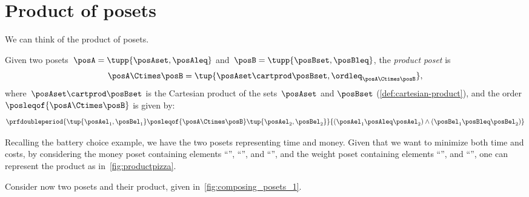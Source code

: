 
\section{Product of posets}
We can think of the product of posets.

\begin{definition}
	\label{def:productposet}
	Given two posets~$\posA=\tupp{\posAset, \posAleq}$ and~$\posB=\tupp{\posBset, \posBleq}$, the \emph{product poset} is
	\begin{equation}
		\posA\Ctimes \posB=\tup{\posAset \cartprod \posBset, \ordleq_{\posA\Ctimes \posB}},
	\end{equation}
	where~$\posAset \cartprod \posBset$ is the Cartesian product of the sets~$\posAset$ and $\posBset$ (\cref{def:cartesian-product}), and the order~$\posleqof{\posA \Ctimes \posB}$ is given by:
	\begin{equation}
		\prfdoubleperiod{\tup{\posAel_1, \posBel_1}
			\posleqof{\posA\Ctimes \posB}
			\tup{\posAel_2, \posBel_2}}{(\posAel_1 \posAleq \posAel_2) \wedge
			(\posBel_1 \posBleq \posBel_2)}
	\end{equation}
\end{definition}
Recalling the battery choice example, we have the two posets representing time and money.
Given that we want to minimize both time and costs, by considering the money poset containing elements ``\poscheap'', ``\posmidrange'', and ``\posexpensive'', and the weight poset containing elements ``\poslight'', and ``\posheavy'', one can represent the product as in~\cref{fig:productpizza}.

\begin{figure*}[h!]
	\centering
	\caption{Product poset of time and weight for battery choices.}
	\label{fig:productpizza}
\end{figure*}

\begin{example}
	Consider now two posets and their product, given in~\cref{fig:composing_posets_1}.
	\begin{figure*}[h!]
		\caption{Product of two posets.}
		\label{fig:composing_posets_1}
	\end{figure*}
\end{example}

